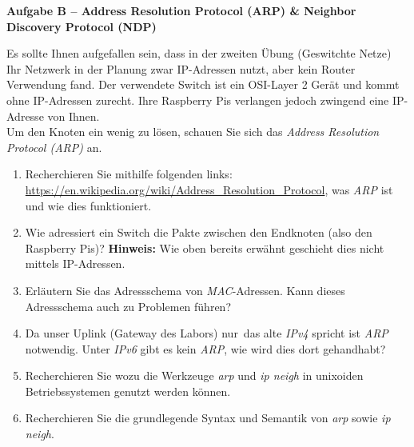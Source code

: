 \documentclass[paper=a4,fontsize=11pt]{scrartcl}%
\numberwithin{equation}{section}
\begin{document}
\begin{center}\Large{\textbf{Aufgabe B -- Address Resolution Protocol (ARP) \& Neighbor Discovery Protocol (NDP)}}\end{center}\vskip0.25in
Es sollte Ihnen aufgefallen sein, dass in der zweiten Übung (Geswitchte Netze) Ihr Netzwerk in der Planung zwar IP-Adressen nutzt, aber kein Router Verwendung fand. Der verwendete Switch ist ein OSI-Layer 2 Gerät und kommt ohne IP-Adressen zurecht. Ihre Raspberry Pis verlangen jedoch zwingend eine IP-Adresse von Ihnen.\\
Um den Knoten ein wenig zu lösen, schauen Sie sich das \emph{Address Resolution Protocol (ARP)} an.
\begin{enumerate}
		\item Recherchieren Sie mithilfe folgenden links: \url{https://en.wikipedia.org/wiki/Address_Resolution_Protocol}, was \emph{ARP} ist und wie dies funktioniert.
		\item Wie adressiert ein Switch die Pakte zwischen den Endknoten (also den Raspberry Pis)? \textbf{Hinweis:} Wie oben bereits erwähnt geschieht dies nicht mittels IP-Adressen.
		\item Erläutern Sie das Adressschema von \emph{MAC}-Adressen. Kann dieses Adressschema auch zu Problemen führen?
		\item Da unser Uplink (Gateway des Labors) \glqq nur\grqq\ das alte \emph{IPv4} spricht ist \emph{ARP} notwendig. Unter \emph{IPv6} gibt es kein \emph{ARP}, wie wird dies dort gehandhabt?
		\item Recherchieren Sie wozu die Werkzeuge \emph{arp} und \emph{ip neigh} in unixoiden Betriebssystemen genutzt werden können.
		\item Recherchieren Sie die grundlegende Syntax und Semantik von \emph{arp} sowie \emph{ip neigh}.
\end{enumerate}
\end{document}
